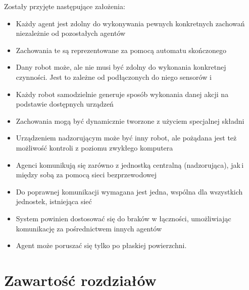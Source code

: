 Zostały przyjęte następujące założenia:
\begin{itemize}
  \item Każdy agent jest zdolny do wykonywania pewnych konkretnych zachowań niezależnie od pozostałych agentów
  \item Zachowania te są reprezentowane za pomocą automatu skończonego
  \item Dany robot może, ale nie musi być zdolny do wykonania konkretnej czynności. Jest to zależne od podłączonych do niego sensorów i 
  \item Każdy robot samodzielnie generuje sposób wykonania danej akcji na podstawie dostępnych urządzeń
  \item Zachowania mogą być dynamicznie tworzone z użyciem specjalnej składni
  \item Urządzeniem nadzorującym może być inny robot, ale pożądana jest też możliwość kontroli z poziomu zwykłego komputera
  \item Agenci komunikują się zarówno z jednostką centralną (nadzorująca), jak\,i między sobą za pomocą sieci bezprzewodowej
  \item Do poprawnej komunikacji wymagana jest jedna, wspólna dla wszystkich jednostek, istniejąca sieć
  \item System powinien dostosować się do braków w łączności, umożliwiając komunikację za pośrednictwem innych agentów
  \item Agent może poruszać się tylko po płaskiej powierzchni.
\end{itemize}


\section{Zawartość rozdziałów}

